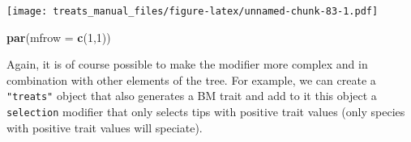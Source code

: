 \documentclass[
]{book}
\newenvironment{Shaded}{\begin{snugshade}}{\end{snugshade}}
\newcommand{\DataTypeTok}[1]{\textcolor[rgb]{0.13,0.29,0.53}{#1}}
\newcommand{\DecValTok}[1]{\textcolor[rgb]{0.00,0.00,0.81}{#1}}
\newcommand{\KeywordTok}[1]{\textcolor[rgb]{0.13,0.29,0.53}{\textbf{#1}}}
\newcommand{\NormalTok}[1]{#1}
\begin{document}
\texttt{[image: treats\_manual\_files/figure-latex/unnamed-chunk-83-1.pdf]}

\begin{Shaded}
\begin{Highlighting}[]
\KeywordTok{par}\NormalTok{(}\DataTypeTok{mfrow =} \KeywordTok{c}\NormalTok{(}\DecValTok{1}\NormalTok{,}\DecValTok{1}\NormalTok{))}
\end{Highlighting}
\end{Shaded}

Again, it is of course possible to make the modifier more complex and in combination with other elements of the tree.
For example, we can create a \texttt{"treats"} object that also generates a BM trait and add to it this object a \texttt{selection} modifier that only selects tips with positive trait values (only species with positive trait values will speciate).
\end{document}
